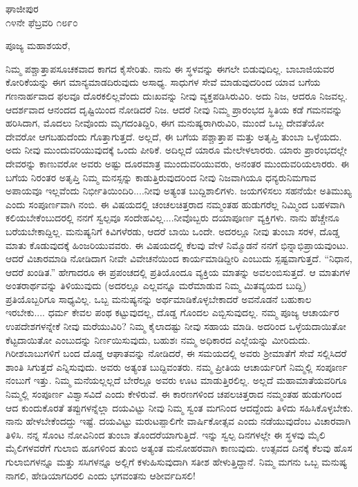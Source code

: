 \begin{flushright}
ಘಾಜೀಪುರ\\೧೪ನೇ ಫೆಬ್ರವರಿ ೧೮೯೦
\end{flushright}

\noindent
ಪೂಜ್ಯ ಮಹಾಶಯರೆ,

ನಿಮ್ಮ ಪಶ್ಚಾತ್ತಾಪಸೂಚಕವಾದ ಕಾಗದ ಕೈಸೇರಿತು. ನಾನು ಈ ಸ್ಥಳವನ್ನು ಈಗಲೇ ಬಿಡುವುದಿಲ್ಲ. ಬಾಬಾಜಿಯವರ ಕೋರಿಕೆಯನ್ನು ಈಗ ಮಾನ್ಯಮಾಡದಿರುವುದು ಅಸಾಧ್ಯ. ಸಾಧುಗಳ ಸೇವೆ ಮಾಡುವುದರಿಂದ ಯಾವ ಬಗೆಯ ಗಣನಾರ್ಹವಾದ ಫಲವೂ ದೊರಕಲಿಲ್ಲವೆಂದು ದುಃಖವನ್ನು ನೀವು ವ್ಯಕ್ತಪಡಿಸಿರುವಿರಿ. ಅದು ನಿಜ, ಆದರೂ ನಿಜವಲ್ಲ. ಆದರ್ಶವಾದ ಆನಂದದ ದೃಷ್ಟಿಯಿಂದ ನೋಡಿದರೆ ನಿಜ. ಆದರೆ ನೀವು ನಿಮ್ಮ ಪ್ರಾರಂಭದ ಸ್ಥಿತಿಯ ಕಡೆ ಗಮನವನ್ನು ಹರಿಸಿದಾಗ, ಮೊದಲು ನೀವೊಂದು ಮೃಗದಂತಿದ್ದಿರಿ, ಈಗ ಮನುಷ್ಯರಾಗಿರುವಿರಿ, ಮುಂದೆ ಒಬ್ಬ ದೇವತೆಯೋ ದೇವರೋ ಆಗಬಹುದೆಂದು ಗೊತ್ತಾ\break ಗುತ್ತದೆ. ಅಲ್ಲದೆ, ಈ ಬಗೆಯ ಪಶ್ಚಾತ್ತಾಪ ಮತ್ತು ಅತೃಪ್ತಿ ತುಂಬಾ ಒಳ್ಳೆಯದು. ಅದು ನೀವು ಮುಂದುವರಿಯುವುದಕ್ಕೆ ಒಂದು ಪೀಠಿಕೆ. ಅದಿಲ್ಲದೆ ಯಾರೂ ಮೇಲೇಳಲಾರರು. ಯಾರು ಪ್ರಾರಂಭದಲ್ಲೇ ದೇವರನ್ನು ಕಾಣುವರೋ ಅವರು ಅಷ್ಟು ದೂರಮಾತ್ರ ಮುಂದುವರಿಯುವರು, ಅನಂತರ ಮುಂದುವರಿಯಲಾರರು. ಈ ಬಗೆಯ ನಿರಂತರ ಅತೃಪ್ತಿ ನಿಮ್ಮ ಮನಸ್ಸನ್ನು ಕಾಡುತ್ತಿರುವುದರಿಂದ ನೀವು ನಿಜವಾಗಿಯೂ ಧನ್ಯರು\enginline{-}ನಿಮಗಾವ ಅಪಾಯವೂ ಇಲ್ಲವೆಂದು ನಿರ್ಭೀತಿಯಿಂದಿರಿ....ನೀವು ಅತ್ಯಂತ ಬುದ್ದಿಶಾಲಿಗಳು. ಜಯಗಳಿಸಲು ಸಹನೆಯೇ ಅತಿಮುಖ್ಯ ಎಂದು ಸಂಪೂರ್ಣವಾಗಿ ನಂಬಿ. ಈ ವಿಷಯದಲ್ಲಿ ಚಂಚಲಚಿತ್ತರಾದ ನಮ್ಮಂತಹ ಹುಡುಗರೆಲ್ಲ ನಿಮ್ಮಿಂದ ಬಹಳವಾಗಿ ಕಲಿಯಬೇಕೆಂಬುದರಲ್ಲಿ ನನಗೆ ಸ್ವಲ್ಪವೂ ಸಂದೇಹವಿಲ್ಲ....ನೀವೊಬ್ಬರು ದಯಾಪೂರ್ಣ ವ್ಯಕ್ತಿಗಳು. ನಾನು ಹೆಚ್ಚೇನೂ ಬರೆಯಬೇಕಾದ್ದಿಲ್ಲ. ಮನುಷ್ಯನಿಗೆ ಕಿವಿಗಳೆರಡು, ಆದರೆ ಬಾಯಿ ಒಂದೇ. ಅದರಲ್ಲೂ ನೀವು ತುಂಬಾ ಸರಳ, ದೊಡ್ಡ ಮಾತು ಕೊಡುವುದಕ್ಕೆ ಹಿಂಜರಿಯುವವರು. ಈ ವಿಷಯದಲ್ಲಿ ಕೆಲವು ವೇಳೆ ನಿಮ್ಮೊಡನೆ ನನಗೆ ಭಿನ್ನಾಭಿಪ್ರಾಯವುಂಟು. ಆದರೆ ವಿಚಾರಮಾಡಿ ನೋಡಿದಾಗ ನೀವೇ ವಿವೇಚನೆಯಿಂದ ಕಾರ್ಯಮಾಡಿದ್ದೀರಿ ಎಂಬುದು ಸ್ಪಷ್ಟವಾಗುತ್ತದೆ. “ನಿಧಾನ, ಆದರೆ ಖಂಡಿತ.'' ಹೇಗಾದರೂ ಈ ಪ್ರಪಂಚದಲ್ಲಿ ಪ್ರತಿಯೊಂದೂ ವ್ಯಕ್ತಿಯ ಮಾತನ್ನು ಅವಲಂಬಿಸುತ್ತದೆ. ಆ ಮಾತುಗಳ ಅಂತರಾರ್ಥವನ್ನು ತಿಳಿಯುವುದು (ಅದರಲ್ಲೂ ಎಲ್ಲವನ್ನೂ ಮರೆಮಾಡುವ ನಿಮ್ಮ ಮಿತವ್ಯಯದ ಬುದ್ದಿ) ಪ್ರತಿಯೊಬ್ಬರಿಗೂ ಸಾಧ್ಯವಿಲ್ಲ. ಒಬ್ಬ ಮನುಷ್ಯನನ್ನು ಅರ್ಥಮಾಡಿಕೊಳ್ಳಬೇಕಾದರೆ ಅವನೊಡನೆ ಬಹುಕಾಲ ಇರಬೇಕು.... ಧರ್ಮ ಕೇವಲ ಪಂಥ ಕಟ್ಟುವುದಲ್ಲ, ದೊಡ್ಡ ಗೊಂದಲ ಎಬ್ಬಿಸುವುದಲ್ಲ. ನಮ್ಮ ಪೂಜ್ಯ ಆಚಾರ್ಯರ ಉಪದೇಶಗಳನ್ನೇಕೆ ನೀವು ಮರೆಯುವಿರಿ? ನಿಮ್ಮ ಕೈಲಾದಷ್ಟು ನೀವು ಸಹಾಯ ಮಾಡಿ. ಅದರಿಂದ ಒಳ್ಳೆಯದಾಯಿತೋ ಕೆಟ್ಟದಾಯಿತೋ ಎಂಬುದನ್ನು ನಿರ್ಣಯಿಸುವುದು, ಬಹುಶಃ ನಮ್ಮ ಅಧಿಕಾರದ ಎಲ್ಲೆಯನ್ನು ಮೀರಿದುದು. ಗಿರೀಶಬಾಬುಗಳಿಗೆ ಬಂದ ದೊಡ್ಡ ಆಘಾತವನ್ನು ನೋಡಿದರೆ, ಈ ಸಮಯದಲ್ಲಿ ಅವರು ಶ‍್ರೀಮಾತೆಗೆ ಸೇವೆ ಸಲ್ಲಿಸಿದರೆ ಶಾಂತಿ ಸಿಗುತ್ತದೆ ಎನ್ನಿಸುವುದು. ಅವರು ಅತ್ಯಂತ ಬುದ್ದಿವಂತರು. ನಮ್ಮ ಪ್ರೀತಿಯ ಆಚಾರ್ಯರಿಗೆ ನಿಮ್ಮಲ್ಲಿ ಸಂಪೂರ್ಣ ನಂಬುಗೆ ಇತ್ತು. ನಿಮ್ಮ ಮನೆಯಲ್ಲಲ್ಲದೆ ಬೇರೆಲ್ಲೂ ಅವರು ಊಟ ಮಾಡುತ್ತಿರಲಿಲ್ಲ. ಅಲ್ಲದೆ ಮಹಾಮಾತೆಯವರಿಗೂ ನಿಮ್ಮಲ್ಲಿ ಸಂಪೂರ್ಣ ವಿಶ್ವಾಸವಿದೆ ಎಂದು ಕೇಳಿರುವೆ. ಈ ಕಾರಣಗಳಿಂದ ಚಪಲಚಿತ್ತರಾದ ನಮ್ಮಂತಹ ಹುಡುಗರಿಂದ ಆದ ಕುಂದುಕೊರತೆ ತಪ್ಪುಗಳನ್ನೆಲ್ಲಾ ದಯವಿಟ್ಟು ನೀವು ನಿಮ್ಮ ಸ್ವಂತ ಮಗನಿಂದ ಆದದ್ದೆಂದು ತಿಳಿದು ಸಹಿಸಿಕೊಳ್ಳಬೇಕು. ನಾನು ಹೇಳಬೇಕೆಂದದ್ದು ಇಷ್ಟೆ. ದಯವಿಟ್ಟು ಮರುಟಪ್ಪಾಲಿಗೇ ವಾರ್ಷಿಕೋತ್ಸವ ಎಂದು ನಡೆಯುವುದೆಂಬ ವಿಚಾರವಾಗಿ ತಿಳಿಸಿ. ನನ್ನ ಸೊಂಟ ನೋವಿನಿಂದ ತುಂಬಾ ತೊಂದರೆಯಾಗುತ್ತಿದೆ. ಇನ್ನು ಸ್ವಲ್ಪ ದಿನಗಳಲ್ಲೇ ಈ ಸ್ಥಳವು ಮೈಲಿ ಮೈಲಿಗಳವರೆಗೆ ಗುಲಾಬಿ ಹೂಗಳಿಂದ ತುಂಬಿ ಅತ್ಯಂತ ಮನೋಹರವಾಗಿ ಕಾಣುವುದು. ಉತ್ಸವದ ದಿನಕ್ಕೆ ಕೆಲವು ಹೊಸ ಗುಲಾಬಿಗಳನ್ನೂ ಮತ್ತು ಸಸಿಗಳನ್ನೂ ಅಲ್ಲಿಗೆ ಕಳುಹಿಸುವುದಾಗಿ ಸತೀಶ ಹೇಳುತ್ತಿದ್ದಾನೆ. ನಿಮ್ಮ ಮಗನು ಒಬ್ಬ ಮನುಷ್ಯ ನಾಗಲಿ, ಹೇಡಿಯಾಗದಿರಲಿ ಎಂದು ಭಗವಂತನು ಆಶೀರ್ವದಿಸಲಿ!

